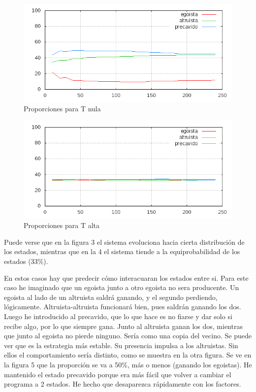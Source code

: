 \documentclass[a4paper,10pt,twocolumn]{article}
\begin{document}
\begin{figure}
\includegraphics[scale=.4]{p-0-1-0-precavido.png}
\caption{Proporciones para T nula}
\end{figure}
\begin{figure}
\includegraphics[scale=.4]{p-10000-1-0-precavido.png}
\caption{Proporciones para T alta}
\end{figure}

Puede verse que en la figura 3 el sistema evoluciona hacia cierta distribuci\'on de los estados, mientras que en la 4 el sistema tiende a la equiprobabilidad de los estados (33\%).

En estos casos hay que predecir c\'omo interacuaran los estados entre si. Para este caso he imaginado que un egoista junto a otro egoista no sera producente. Un egoista al lado de un altruista saldr\'a ganando, y el segundo perdiendo, l\'ogicamente. Altruista-altruista funcionar\'a bien, pues saldr\'an ganando los dos. Luego he introducido al precavido, que lo que hace es no fiarse y dar solo si recibe algo, por lo que siempre gana. Junto al altruista ganan los dos, mientras que junto al egoista no pierde ninguno. Ser\'ia como una copia del vecino. Se puede ver que es la estrategia m\'as estable. Su presencia impulsa a los altruistas. Sin ellos el comportamiento ser\'ia distinto, como se muestra en la otra figura. Se ve en la figura 5 que la proporci\'on se va a 50\%, m\'as o menos (ganando los egoistas). He mantenido el estado precavido porque era m\'as f\'acil que volver a cambiar el programa a 2 estados. He hecho que desaparezca r\'apidamente con los factores.
\end{document}
